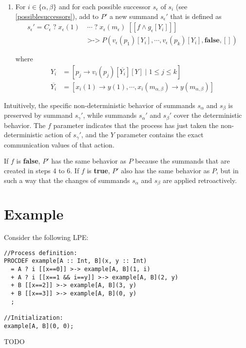 \begin{enumerate}
\item For $i \in \{\alpha, \beta\}$ and for each possible successor $s_\epsilon$ of $s_i$ (see \ref{possiblesuccessors}), add to $P'$ a new summand ${s_\epsilon}'$ that is defined as
\begin{align*}
{s_\epsilon}' = C_\epsilon \; \texttt{?} \; x_\epsilon(1) \; &\cdots{} \; \texttt{?} \; x_\epsilon(m_\epsilon) \; [[f \land g_\epsilon[Y_i]]] \\
&\texttt{>->} \; P(v_\epsilon(p_1)[Y_i], \cdots{}, v_\epsilon(p_k)[Y_i], \textbf{false}, [])
\end{align*}

where
\begin{align*}
Y_i &= [ p_j \rightarrow v_i(p_j)[\overline{Y_i}][Y] \;|\; 1 \leq j \leq k ] \\
\overline{Y_i} &= [x_i(1) \rightarrow y(1), \cdots{}, x_i(m_{\alpha,\beta}) \rightarrow y(m_{\alpha,\beta})]
\end{align*}

\end{enumerate}

Intuitively, the specific non-deterministic behavior of summands $s_\alpha$ and $s_\beta$ is preserved by summand ${s_\gamma}'$, while summands ${s_\alpha}'$ and ${s_\beta}'$ cover the deterministic behavior.
The $f$ parameter indicates that the process has just taken the non-deterministic action of ${s_\gamma}'$, and the $Y$ parameter contains the exact communication values of that action.

If $f$ is \textbf{false}, $P'$ has the same behavior as $P$ because the summands that are created in steps 4 to 6.
If $f$ is \textbf{true}, $P'$ also has the same behavior as $P$, but in such a way that the changes of summands $s_\alpha$ and $s_\beta$ are applied retroactively.

\section{Example}

Consider the following LPE:

\begin{lstlisting}
//Process definition:
PROCDEF example[A :: Int, B](x, y :: Int)
  = A ? i [[x==0]] >-> example[A, B](1, i)
  + A ? i [[x==1 && i==y]] >-> example[A, B](2, y)
  + B [[x==2]] >-> example[A, B](3, y)
  + B [[x==3]] >-> example[A, B](0, y)
  ;

//Initialization:
example[A, B](0, 0);
\end{lstlisting}

TODO

